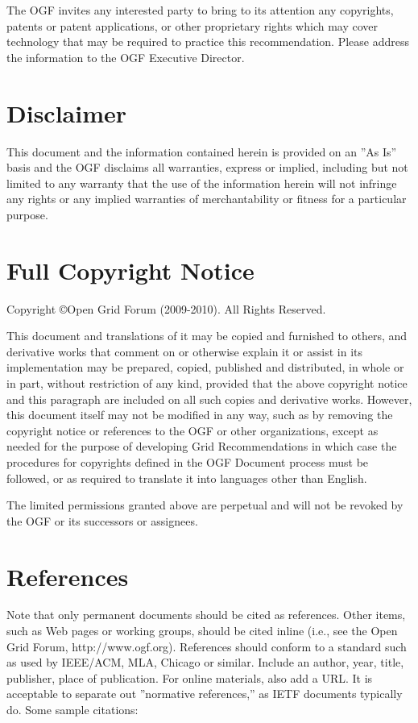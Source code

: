 \documentclass[10pt,a4paper,british]{article}
\begin{document}
The OGF invites any interested party to bring to its attention any
copyrights, patents or patent applications, or other proprietary
rights which may cover technology that may be required to practice
this recommendation. Please address the information to the OGF
Executive Director.

\section{Disclaimer}
This document and the information contained herein is provided on an
''As Is'' basis and the OGF disclaims all warranties, express or
implied, including but not limited to any warranty that the use of the
information herein will not infringe any rights or any implied
warranties of merchantability or fitness for a particular purpose.

\section{Full Copyright Notice}
Copyright \copyright Open Grid Forum (2009-2010). All Rights Reserved.

This document and translations of it may be copied and furnished to
others, and derivative works that comment on or otherwise explain it
or assist in its implementation may be prepared, copied, published and
distributed, in whole or in part, without restriction of any kind,
provided that the above copyright notice and this paragraph are
included on all such copies and derivative works. However, this
document itself may not be modified in any way, such as by removing
the copyright notice or references to the OGF or other organizations,
except as needed for the purpose of developing Grid Recommendations in
which case the procedures for copyrights defined in the OGF Document
process must be followed, or as required to translate it into
languages other than English.

The limited permissions granted above are perpetual and will not be
revoked by the OGF or its successors or assignees.

\section{References}

Note that only permanent documents should be cited as
references. Other items, such as Web pages or working groups, should
be cited inline (i.e., see the Open Grid Forum,
http://www.ogf.org). References should conform to a standard such as
used by IEEE/ACM, MLA, Chicago or similar. Include an author, year,
title, publisher, place of publication. For online materials, also add
a URL. It is acceptable to separate out ''normative references,'' as
IETF documents typically do. Some sample citations:
\end{document}
